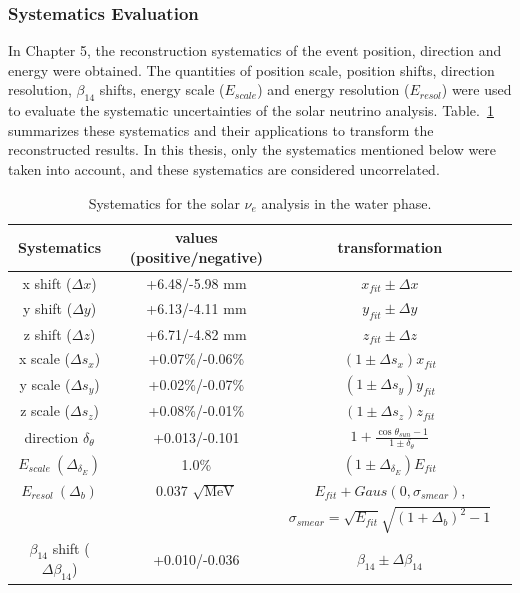 
\subsubsection{Systematics Evaluation}
In Chapter 5, the reconstruction systematics of the event position, direction and energy were obtained. The quantities of position scale, position shifts, direction resolution, $\beta_{14}$ shifts, energy scale ($E_{scale}$) and energy resolution ($E_{resol}$) were used to evaluate the systematic uncertainties of the solar neutrino analysis. Table.~\ref{tab:solar_uncertainties} summarizes these systematics and their applications to transform the reconstructed results. In this thesis, only the systematics mentioned below were taken into account, and these systematics are considered uncorrelated. 

\begin{table}[ht]
	\centering
	\caption{Systematics for the solar $\nu_e$ analysis in the water phase.}
	\label{tab:solar_uncertainties}
	\begin{tabular*}{150mm}{c@{\extracolsep{\fill}}ccc}
		\toprule
		Systematics & values (positive/negative) & transformation   \\
		\hline
		x shift ($\Delta x$) & +6.48/-5.98 mm  & $x_{fit}\pm \Delta x$ \\	
		y shift ($\Delta y$)& +6.13/-4.11 mm   & $y_{fit}\pm \Delta y$ \\
		z shift ($\Delta z$)& +6.71/-4.82 mm   & $z_{fit}\pm \Delta z$ \\
		x scale ($\Delta s_x$)& +0.07\%/-0.06\%  & $(1\pm \Delta s_x)x_{fit}$\\	
		y scale ($\Delta s_y$)& +0.02\%/-0.07\%  & $(1\pm \Delta s_y)y_{fit}$ \\
		z scale ($\Delta s_z$)& +0.08\%/-0.01\%  & $(1\pm \Delta s_z)z_{fit}$ \\
		direction $\delta_\theta$  & +0.013/-0.101 & $1+\frac{\cos\theta_{sun}-1}{1\pm\delta_\theta}$\\
		$E_{scale}~(\Delta_{\delta_E})$ &  1.0\%  & $(1\pm \Delta_{\delta_E})E_{fit}$\\
		$E_{resol}~(\Delta_b)$ &  0.037 $\sqrt{\mathrm{MeV}}$  & $E_{fit}+Gaus(0,\sigma_{smear})$, \\
		& &$\sigma_{smear}=\sqrt{E_{fit}}\sqrt{(1+\Delta_b)^2-1}$\\
		$\beta_{14}$ shift ($\Delta \beta_{14}$) & +0.010/-0.036 & $\beta_{14}\pm \Delta \beta_{14}$\\
		\bottomrule
	\end{tabular*}
\end{table}

